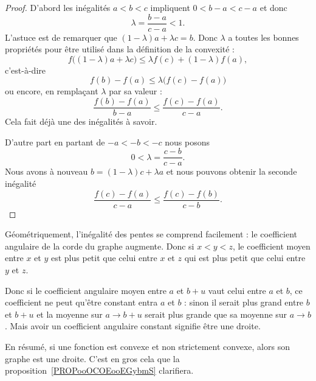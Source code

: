 \begin{proof}
    D'abord les inégalités \( a<b<c\) impliquent \( 0<b-a<c-a\) et donc
    \begin{equation}
        \lambda=\frac{ b-a }{ c-a }<1.
    \end{equation}
    L'astuce est de remarquer que \( (1-\lambda)a+\lambda c=b\). Donc \( \lambda\) a toutes les bonnes propriétés pour être utilisé dans la définition de la convexité :
    \begin{equation}
        f\big( (1-\lambda)a+\lambda c \big)\leq \lambda f(c)+(1-\lambda)f(a),
    \end{equation}
    c'est-à-dire
    \begin{equation}
        f(b)-f(a)\leq \lambda\big( f(c)-f(a) \big)
    \end{equation}
    ou encore, en remplaçant \( \lambda\) par sa valeur :
    \begin{equation}
        \frac{ f(b)-f(a) }{ b-a }\leq \frac{ f(c)-f(a) }{ c-a }.
    \end{equation}
    Cela fait déjà une des inégalités à savoir.

    D'autre part en partant de \( -a<-b<-c\) nous posons
    \begin{equation}
        0<\lambda=\frac{ c-b }{ c-a }.
    \end{equation}
    Nous avons à nouveau \( b=(1-\lambda)c+\lambda a\) et nous pouvons obtenir la seconde inégalité
    \begin{equation}
        \frac{ f(c)-f(a) }{ c-a }\leq \frac{ f(c)-f(b) }{ c-b }.
    \end{equation}
\end{proof}

Géométriquement, l'inégalité des pentes se comprend facilement : le coefficient angulaire de la corde du graphe augmente. Donc si \( x<y<z\), le coefficient moyen entre \( x\) et \( y\) est plus petit que celui entre \( x\) et \( z\) qui est plus petit que celui entre \( y\) et \( z\).

Donc si le coefficient angulaire moyen entre \( a\) et \( b+u\) vaut celui entre \( a\) et \( b\), ce coefficient ne peut qu'être constant entra \( a\) et \( b\) : sinon il serait plus grand entre \( b\) et \( b+u\) et la moyenne sur \( a\to b+u\) serait plus grande que sa moyenne sur \( a\to b\). Mais avoir un coefficient angulaire constant signifie être une droite.

En résumé, si une fonction est convexe et non strictement convexe, alors son graphe est une droite. C'est en gros cela que la proposition~\ref{PROPooOCOEooEGybmS} clarifiera.

